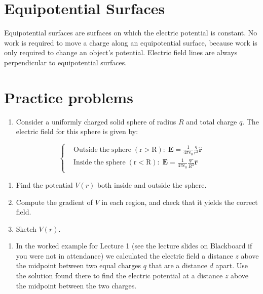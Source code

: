 \documentclass[
  letterpaper,
  DIV=11,
  numbers=noendperiod]{scrreprt}
\providecommand{\tightlist}{%
  \setlength{\itemsep}{0pt}\setlength{\parskip}{0pt}}\usepackage{longtable,booktabs,array}
\begin{document}
\section{Equipotential Surfaces}\label{equipotential-surfaces}

Equipotential surfaces are surfaces on which the electric potential is
constant. No work is required to move a charge along an equipotential
surface, because work is only required to change an object's potential.
Electric field lines are always perpendicular to equipotential surfaces.

\section{Practice problems}\label{practice-problems-2}

\begin{enumerate}
\def\labelenumi{\arabic{enumi})}
\tightlist
\item
  Consider a uniformly charged solid sphere of radius \(R\) and total
  charge \(q\). The electric field for this sphere is given by:
\end{enumerate}

\[
\left\{
    \begin{aligned}
         & \mathrm{Outside \; the \; sphere \; (r > R):} \; \mathrm{\mathbf{E}}= \frac{1}{4\pi\epsilon_0} \frac{q}{r^2} \hat{\mathrm{\mathbf{r}}}  \\
         & \mathrm{Inside \; the \; sphere \; (r < R):} \; \mathrm{\mathbf{E}}= \frac{1}{4\pi\epsilon_0} \frac{qr}{R^3} \hat{\mathrm{\mathbf{r}}} \\
    \end{aligned}
\right.
\]

\begin{enumerate}
\def\labelenumi{(\alph{enumi})}
\tightlist
\item
  Find the potential \(V(r)\) both inside and outside the sphere.
\item
  Compute the gradient of \(V\) in each region, and check that it yields
  the correct field.
\item
  Sketch \(V(r)\).
\end{enumerate}

\begin{enumerate}
\def\labelenumi{\arabic{enumi})}
\setcounter{enumi}{1}
\tightlist
\item
  In the worked example for Lecture 1 (see the lecture slides on
  Blackboard if you were not in attendance) we calculated the electric
  field a distance \(z\) above the midpoint between two equal charges
  \(q\) that are a distance \(d\) apart. Use the solution found there to
  find the electric potential at a distance \(z\) above the midpoint
  between the two charges.
\end{enumerate}
\end{document}
